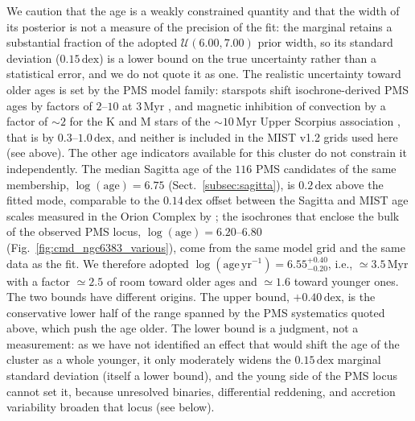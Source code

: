 \documentclass{aa}
\begin{document}
We caution that the age is a weakly constrained quantity and that the width of its posterior is not a measure of the precision of the fit: the marginal retains a substantial fraction of the adopted $\mathcal{U}(6.00,7.00)$ prior width, so its standard deviation ($0.15\,\mathrm{dex}$) is a lower bound on the true uncertainty rather than a statistical error, and we do not quote it as one. The realistic uncertainty toward older ages is set by the PMS model family: starspots shift isochrone-derived PMS ages by factors of $2$--$10$ at $3\,\mathrm{Myr}$ \citep{2015ApJ...807..174S}, and magnetic inhibition of convection by a factor of $\sim2$ for the K and M stars of the $\sim10\,\mathrm{Myr}$ Upper Scorpius association \citep{2016A&A...593A..99F}, that is by $0.3$--$1.0\,\mathrm{dex}$, and neither is included in the MIST v1.2 grids used here (see above). The other age indicators available for this cluster do not constrain it independently. The median Sagitta age of the $116$ PMS candidates of the same membership, $\log(\mathrm{age})=6.75$ (Sect.~\ref{subsec:sagitta}), is $0.2\,\mathrm{dex}$ above the fitted mode, comparable to the $0.14\,\mathrm{dex}$ offset between the Sagitta and MIST age scales measured in the Orion Complex by \citet{2023AJ....165..182K}; the isochrones that enclose the bulk of the observed PMS locus, $\log(\mathrm{age})=6.20$--$6.80$ (Fig.~\ref{fig:cmd_ngc6383_various}), come from the same model grid and the same data as the fit. We therefore adopted $\log(\mathrm{age}\,\mathrm{yr^{-1}}) = 6.55^{+0.40}_{-0.20}$, i.e., $\simeq3.5\,\mathrm{Myr}$ with a factor $\simeq2.5$ of room toward older ages and $\simeq1.6$ toward younger ones. The two bounds have different origins. The upper bound, $+0.40\,\mathrm{dex}$, is the conservative lower half of the range spanned by the PMS systematics quoted above, which push the age older. The lower bound is a judgment, not a measurement: as we have not identified an effect that would shift the age of the cluster as a whole younger, it only moderately widens the $0.15\,\mathrm{dex}$ marginal standard deviation (itself a lower bound), and the young side of the PMS locus cannot set it, because unresolved binaries, differential reddening, and accretion variability broaden that locus (see below).
\end{document}
